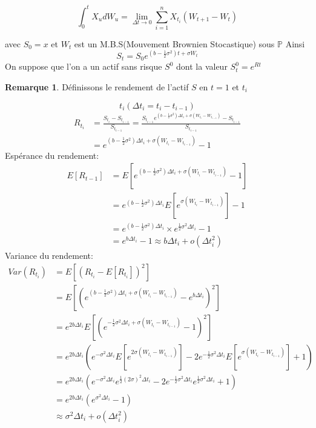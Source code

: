 \documentclass{article}
\theoremstyle{plain}
\theoremstyle{definition}
\newtheorem{remq}[thm]{Remarque}
\begin{document}
\begin{equation}
\int_0^t X_u dW_u=\lim_{\Delta t\rightarrow 0}\sum_{i=1}^{n}X_{t_i}(W_{t+1}-W_t)
\end{equation}

avec $S_0=x$ et $W_t$ est un M.B.S(Mouvement Brownien Stocastique) sous $\mathbb{P}$
Ainsi
\begin{equation}
S_t=S_0e^{(b-\frac{1}{2}\sigma^2)t+\sigma W_t}
\end{equation}
On suppose que l'on a un actif sans risque $S^0$ dont la valeur $S_t^0=e^{Rt}$
\begin{remq}
	D\'efinissons le rendement de l'actif $S$ en $t=1$ et $t_i$
\end{remq}
\begin{equation}
t_i(\Delta t_i=t_i-t_{i-1})
\end{equation}
\begin{equation}
\begin{split}
R_{t_i}&=\frac{S_{t_i}-S_{t_{i-1}}}{S_{t_{i-1}}}=\frac{S_{t_{i-1}}e^{(b-\frac{1}{2}\sigma^2)\Delta t_i+\sigma(W_{t_i}-W_{t_{i-1}})}-S_{t_{i-1}}}{S_{t_{i-1}}}\\
&=e^{(b-\frac{1}{2}\sigma^2)\Delta t_i+\sigma(W_{t_i}-W_{t_{i-1}})}-1
\end{split}
\end{equation}
Esp\'erance du rendement:
\begin{equation}
\begin{split}
E[R_{t-1}]&=E[e^{(b-\frac{1}{2}\sigma^2)\Delta t_i+\sigma(W_{t_i}-W_{t_{i-1}})}-1]\\
&=e^{(b-\frac{1}{2}\sigma^2)\Delta t_i} E[e^{\sigma(W_{t_i}-W_{t_{i-1}})}]-1\\
&=e^{(b-\frac{1}{2}\sigma^2)\Delta t_i}\times e^{\frac{1}{2}\sigma^2\Delta t_i}-1\\
&=e^{b\Delta t_i}-1\approx b\Delta t_i+o(\Delta t_i^2)
\end{split}
\end{equation}
Variance du rendement:
\begin{equation}
\begin{split}
Var(R_{t_i})&=E[(R_{t_i}-E[R_{t_i}])^2]\\
&=E[(e^{(b-\frac{1}{2}\sigma^2)\Delta t_i+\sigma(W_{t_i}-W_{t_{i-1}})}-e^{b\Delta t_i})^2]\\
&=e^{2b\Delta t_i}E[(e^{-\frac{1}{2}\sigma^2\Delta t_i+\sigma(W_{t_i}-W_{t_{i-1}})}-1)^2]\\
&=e^{2b\Delta t_i}(e^{-\sigma^2\Delta t_i}E[e^{2\sigma (W_{t_i}-W_{t_{i-1}})}]-2e^{-\frac{1}{2}\sigma^2\Delta t_i}E[e^{\sigma (W_{t_i}-W_{t_{i-1}})}]+1)\\
&=e^{2b\Delta t_i}(e^{-\sigma^2\Delta t_i} e^{\frac{1}{2}(2\sigma)^2\Delta t_i}-2e^{-\frac{1}{2}\sigma^2\Delta t_i}e^{\frac{1}{2}\sigma^2\Delta t_i}+1)\\
&=e^{2b\Delta t_i}(e^{\sigma^2\Delta t_i}-1)\\
&\approx\sigma^2\Delta t_i+o(\Delta t_i^2)
\end{split}
\end{equation}
\end{document}
